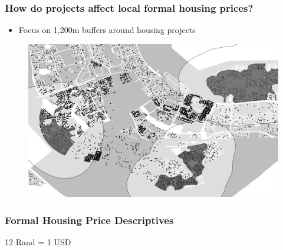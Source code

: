 \documentclass[aspectratio=149]{beamer}
\begin{document}

\begin{frame}
\frametitle{How do projects affect local formal housing prices?}
\begin{itemize}
  \item Focus on 1,200m buffers around housing projects
\end{itemize}
\begin{center}
\begin{figure}
\includegraphics[scale=0.30]{design2.png}
\vspace{-3mm}
\end{figure}
\end{center}
\end{frame}



\begin{frame}
\frametitle{Formal Housing Price Descriptives}
\begin{center}
\resizebox{.95\textwidth}{!}{  

}
\end{center}
12 Rand = 1 USD
\end{frame}

\end{document}
